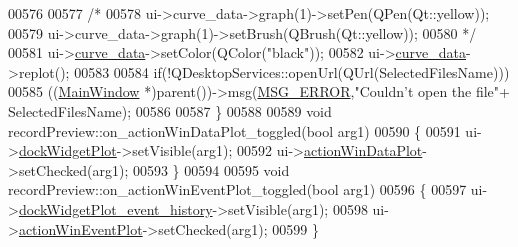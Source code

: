 \begin{DoxyCode}
00576 
00577      \textcolor{comment}{/*}
00578 \textcolor{comment}{     ui->curve\_data->graph(1)->setPen(QPen(Qt::yellow));}
00579 \textcolor{comment}{     ui->curve\_data->graph(1)->setBrush(QBrush(Qt::yellow));}
00580 \textcolor{comment}{     */}
00581      ui->\hyperlink{a00081_a247d94481323c0bc4f8b6458a8a535dd}{curve\_data}->setColor(QColor(\textcolor{stringliteral}{"black"}));
00582      ui->\hyperlink{a00081_a247d94481323c0bc4f8b6458a8a535dd}{curve\_data}->replot();
00583 
00584        \textcolor{keywordflow}{if}(!QDesktopServices::openUrl(QUrl(SelectedFilesName)))
00585            ((\hyperlink{a00017}{MainWindow} *)parent())->msg(\hyperlink{a00090_aa8a990825a5a62c89d2fb8b08d8a1070}{MSG\_ERROR},\textcolor{stringliteral}{"Couldn't open the file"}+
      SelectedFilesName);
00586 
00587 \}
00588 
00589 \textcolor{keywordtype}{void} recordPreview::on\_actionWinDataPlot\_toggled(\textcolor{keywordtype}{bool} arg1)
00590 \{
00591     ui->\hyperlink{a00081_a07b76f17803ec09e0367b72938bbd097}{dockWidgetPlot}->setVisible(arg1);
00592     ui->\hyperlink{a00081_aa09067a9c96c9cd78f75261a9fcb89f0}{actionWinDataPlot}->setChecked(arg1);
00593 \}
00594 
00595 \textcolor{keywordtype}{void} recordPreview::on\_actionWinEventPlot\_toggled(\textcolor{keywordtype}{bool} arg1)
00596 \{
00597     ui->\hyperlink{a00081_a2a8f7ee8d4458dd20481c8a1c29ce185}{dockWidgetPlot\_event\_history}->setVisible(arg1);
00598     ui->\hyperlink{a00081_ac72ec9c8679d46fd43a87f99ee6db893}{actionWinEventPlot}->setChecked(arg1);
00599 \}
\end{DoxyCode}
